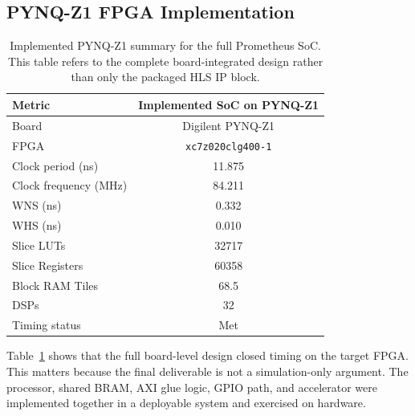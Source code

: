 \documentclass[conference]{IEEEtran}
\begin{document}
\subsection{PYNQ-Z1 FPGA Implementation}
\begin{table}[t]
\centering
\caption{Implemented PYNQ-Z1 summary for the full Prometheus SoC. This table refers to the complete board-integrated design rather than only the packaged HLS IP block.}
\label{tab:fpga_soc}
\begin{tabular}{lc}
\toprule
Metric & Implemented SoC on PYNQ-Z1 \\
\midrule
Board & Digilent PYNQ-Z1 \\
FPGA & \texttt{xc7z020clg400-1} \\
Clock period (ns) & 11.875 \\
Clock frequency (MHz) & 84.211 \\
WNS (ns) & 0.332 \\
WHS (ns) & 0.010 \\
Slice LUTs & 32717 \\
Slice Registers & 60358 \\
Block RAM Tiles & 68.5 \\
DSPs & 32 \\
Timing status & Met \\
\bottomrule
\end{tabular}
\end{table}

Table~\ref{tab:fpga_soc} shows that the full board-level design closed timing on the target FPGA. This matters because the final deliverable is not a simulation-only argument. The processor, shared BRAM, AXI glue logic, GPIO path, and accelerator were implemented together in a deployable system and exercised on hardware.
\end{document}
